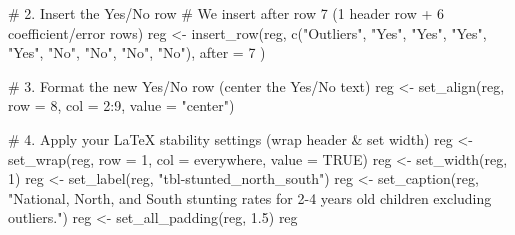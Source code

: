 \documentclass[
  letterpaper,
  DIV=11,
  numbers=noendperiod]{scrartcl}
\newenvironment{Shaded}{\begin{snugshade}}{\end{snugshade}}
\newcommand{\AttributeTok}[1]{\textcolor[rgb]{0.40,0.45,0.13}{#1}}
\newcommand{\CommentTok}[1]{\textcolor[rgb]{0.37,0.37,0.37}{#1}}
\newcommand{\ConstantTok}[1]{\textcolor[rgb]{0.56,0.35,0.01}{#1}}
\newcommand{\DecValTok}[1]{\textcolor[rgb]{0.68,0.00,0.00}{#1}}
\newcommand{\FloatTok}[1]{\textcolor[rgb]{0.68,0.00,0.00}{#1}}
\newcommand{\FunctionTok}[1]{\textcolor[rgb]{0.28,0.35,0.67}{#1}}
\newcommand{\NormalTok}[1]{\textcolor[rgb]{0.00,0.23,0.31}{#1}}
\newcommand{\OtherTok}[1]{\textcolor[rgb]{0.00,0.23,0.31}{#1}}
\newcommand{\SpecialCharTok}[1]{\textcolor[rgb]{0.37,0.37,0.37}{#1}}
\newcommand{\StringTok}[1]{\textcolor[rgb]{0.13,0.47,0.30}{#1}}
\begin{document}
\begin{Shaded}
\begin{Highlighting}[]
\CommentTok{\# 2. Insert the Yes/No row}
\CommentTok{\# We insert after row 7 (1 header row + 6 coefficient/error rows)}
\NormalTok{reg }\OtherTok{\textless{}{-}} \FunctionTok{insert\_row}\NormalTok{(reg, }
  \FunctionTok{c}\NormalTok{(}\StringTok{"Outliers"}\NormalTok{, }\StringTok{"Yes"}\NormalTok{, }\StringTok{"Yes"}\NormalTok{, }\StringTok{"Yes"}\NormalTok{, }\StringTok{"Yes"}\NormalTok{, }\StringTok{"No"}\NormalTok{, }\StringTok{"No"}\NormalTok{, }\StringTok{"No"}\NormalTok{, }\StringTok{"No"}\NormalTok{), }
  \AttributeTok{after =} \DecValTok{7}
\NormalTok{)}

\CommentTok{\# 3. Format the new Yes/No row (center the Yes/No text)}
\NormalTok{reg }\OtherTok{\textless{}{-}} \FunctionTok{set\_align}\NormalTok{(reg, }\AttributeTok{row =} \DecValTok{8}\NormalTok{, }\AttributeTok{col =} \DecValTok{2}\SpecialCharTok{:}\DecValTok{9}\NormalTok{, }\AttributeTok{value =} \StringTok{"center"}\NormalTok{)}

\CommentTok{\# 4. Apply your LaTeX stability settings (wrap header \& set width)}
\NormalTok{reg }\OtherTok{\textless{}{-}} \FunctionTok{set\_wrap}\NormalTok{(reg, }\AttributeTok{row =} \DecValTok{1}\NormalTok{, }\AttributeTok{col =}\NormalTok{ everywhere, }\AttributeTok{value =} \ConstantTok{TRUE}\NormalTok{)}
\NormalTok{reg }\OtherTok{\textless{}{-}} \FunctionTok{set\_width}\NormalTok{(reg, }\DecValTok{1}\NormalTok{)}
\NormalTok{reg }\OtherTok{\textless{}{-}} \FunctionTok{set\_label}\NormalTok{(reg, }\StringTok{"tbl{-}stunted\_north\_south"}\NormalTok{)}
\NormalTok{reg }\OtherTok{\textless{}{-}} \FunctionTok{set\_caption}\NormalTok{(reg, }\StringTok{"National, North, and South stunting rates for 2{-}4 years old children excluding outliers."}\NormalTok{)}
\NormalTok{reg }\OtherTok{\textless{}{-}} \FunctionTok{set\_all\_padding}\NormalTok{(reg, }\FloatTok{1.5}\NormalTok{)}
\NormalTok{reg}
\end{Highlighting}
\end{Shaded}
\end{document}
